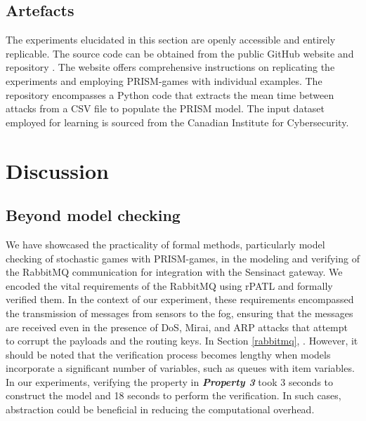 \subsection{Artefacts}
\label{sub:artefact}
The experiments elucidated in this section are openly accessible and entirely replicable. The source code can be obtained from the public GitHub website and repository \cite{edcc23}. The website offers comprehensive instructions on replicating the experiments and employing PRISM-games with individual examples. The repository encompasses a Python code that extracts the mean time between attacks from a CSV file to populate the PRISM model. The input dataset employed for learning is sourced from the Canadian Institute for Cybersecurity.

\section{Discussion}
\label{discussion}%
\subsection{Beyond model checking}
We have showcased the practicality of formal methods, particularly model checking of stochastic games with PRISM-games, in the modeling and verifying of the RabbitMQ communication  for integration with the Sensinact gateway. We encoded the vital requirements of the RabbitMQ  using rPATL and formally verified them. In the context of our experiment, these requirements encompassed the transmission of messages from sensors to the fog, ensuring that the messages are received even in the presence of DoS, Mirai, and ARP attacks that attempt to corrupt the payloads and the routing keys. In Section \ref{rabbitmq}, .  However, it should be noted that the verification process becomes lengthy when models incorporate a significant number of variables, such as queues with item variables. In our experiments, verifying the property in \emph{\bfseries{Property 3}} took 3 seconds to construct the model and 18 seconds to perform the verification. In such cases, abstraction could be beneficial in reducing the computational overhead.

